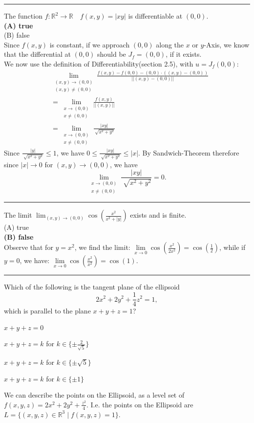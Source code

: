 \documentclass[a4paper,fontsize = 10pt]{article}
\newcommand{\cmark}{\ding{51}}%
\newcommand{\correct}{\rlap{$\square$}{\raisebox{2pt}{\hspace{1pt}\cmark}}\hspace{-2.5pt}}
\def\R{\mathbb{R}}
\begin{document}
\vspace{0.1 cm}
\hrule
\vspace{0.2 cm}
The function $f: \R^2 \to \R \quad f(x,y) = |xy|$ is differentiable at $(0,0)$.
\\\textbf{(A) true}
\\(B) false
\\Since $f(x,y)$ is constant, if we approach $(0,0)$ along the $x$ or $y$-Axis, we know that the differential at $(0,0)$ should be $J_f = (0,0)$, if it exists.
\\We now use the definition of Differentiability(section 2.5), with $u = J_f(0,0)$:
\begin{align*}
  &\lim_{\substack{(x,y) \to (0,0) \\ (x,y) \neq (0,0)}} \frac{f(x,y)-f(0,0)-(0,0)\cdot((x,y)-(0,0))}{||(x,y)-(0,0)||}\\
  &= \lim_{\substack{x \to (0,0) \\ x \neq (0,0)}} \frac{f(x,y)}{||(x,y)||}\\
  &= \lim_{\substack{x \to (0,0) \\ x \neq (0,0)}} \frac{|xy|}{\sqrt[]{x^2+y^2}}
\end{align*}
Since $\frac{|y|}{\sqrt[]{x^2+y^2}} \leq 1$, we have $0 \leq\frac{|xy|}{\sqrt[]{x^2+y^2}} \leq |x|$. 
By Sandwich-Theorem therefore since $|x| \to 0$ for $(x,y) \to (0,0)$, we have 
\[\lim_{\substack{x \to (0,0) \\ x \neq (0,0)}} \frac{|xy|}{\sqrt[]{x^2+y^2}} = 0.\]
\vspace{0.1cm}
\hrule
\vspace{0.2cm}
The limit $\lim_{(x,y) \to (0,0)} \cos(\frac{x^2}{x^2 + |y|})$ exists and is finite.
\\(A) true
\\\textbf{(B) false}
\\Observe that for $y=x^2$, we find the limit: $\underset{x \to 0}{\lim} \cos \left ( \frac {x^2}{2x^2}\right ) = \cos \left ( \frac 1 2 \right )$, while if $y=0$, we have: $\underset{x \to 0}{\lim} \cos \left ( \frac {x^2}{x^2}\right ) = \cos (1)$.

\vspace{0.1cm}
\hrule
\vspace{0.2cm}

Which of the following is the tangent plane of the ellipsoid \[2x^2 + 2y^2 + \frac{1}{4}z^2 = 1,\] which is parallel to the plane $x + y + z = 1$?
\begin{Checkboxes}
  \item $x + y + z = 0$
  \item \(x+y+z = k\) for \(k \in \{\pm\frac{2}{\sqrt{5}}\}\)
  \item [\correct] \(x + y + z = k\) for $k \in \{\pm \sqrt{5}\}$
  \item \(x + y + z = k\) for $k \in \{\pm 1\}$
\end{Checkboxes}
We can describe the points on the Ellipsoid, as a level set of \(f(x, y, z) = 2x^2 + 2y^2 + \frac{z^2}{4}\). I.e. the points on the Ellipsoid are $L = \{(x,y,z) \in \R^3 \mid f(x,y,z) = 1\}$.
\end{document}

